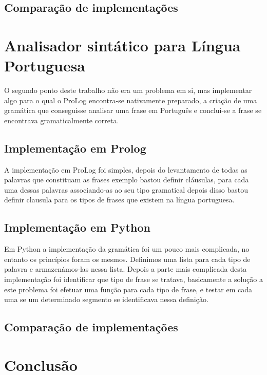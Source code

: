 \documentclass[12pt,a4paper]{report}
\begin{document}
\subsection{Comparação de implementações}

\section{Analisador sintático para Língua Portuguesa}
O segundo ponto deste trabalho não era um problema em si, mas implementar algo para o qual o ProLog encontra-se nativamente preparado, a criação de uma gramática que conseguisse analisar uma frase em Português e conclui-se a frase se encontrava gramaticalmente correta.
\subsection{Implementação em Prolog}
A implementação em ProLog foi simples, depois do levantamento de todas as palavras que constituam as frases exemplo bastou definir cláusulas, para cada uma dessas palavras associando-as ao seu tipo gramatical depois disso bastou definir clausula para os tipos de frases que existem na língua portuguesa.
\subsection{Implementação em Python}
Em Python a implementação da gramática foi um pouco mais complicada, no entanto os princípios foram os mesmos. Definimos uma lista para cada tipo de palavra e armazenámos-las nessa lista. Depois a parte mais complicada desta implementação foi identificar que tipo de frase se tratava, basicamente a solução a este problema foi efetuar uma função para cada tipo de frase, e testar em cada uma se um determinado segmento se identificava nessa definição. 
\subsection{Comparação de implementações}

\section{Conclusão}
\end{document}

